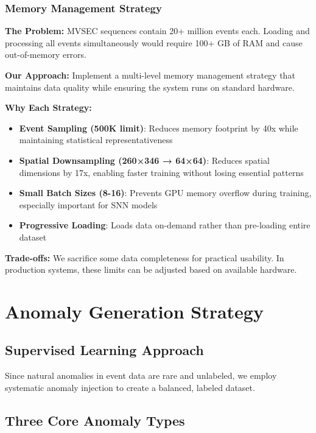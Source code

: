 \documentclass[12pt,a4paper]{article}
\begin{document}
\subsubsection{Memory Management Strategy}

\textbf{The Problem:} MVSEC sequences contain 20+ million events each. Loading and processing all events simultaneously would require 100+ GB of RAM and cause out-of-memory errors.

\textbf{Our Approach:} Implement a multi-level memory management strategy that maintains data quality while ensuring the system runs on standard hardware.

\textbf{Why Each Strategy:}
\begin{itemize}
    \item \textbf{Event Sampling (500K limit)}: Reduces memory footprint by 40x while maintaining statistical representativeness
    \item \textbf{Spatial Downsampling (260×346 → 64×64)}: Reduces spatial dimensions by 17x, enabling faster training without losing essential patterns
    \item \textbf{Small Batch Sizes (8-16)}: Prevents GPU memory overflow during training, especially important for SNN models
    \item \textbf{Progressive Loading}: Loads data on-demand rather than pre-loading entire dataset
\end{itemize}

\textbf{Trade-offs:} We sacrifice some data completeness for practical usability. In production systems, these limits can be adjusted based on available hardware.

\section{Anomaly Generation Strategy}

\subsection{Supervised Learning Approach}

Since natural anomalies in event data are rare and unlabeled, we employ systematic anomaly injection to create a balanced, labeled dataset.

\subsection{Three Core Anomaly Types}
\end{document}
